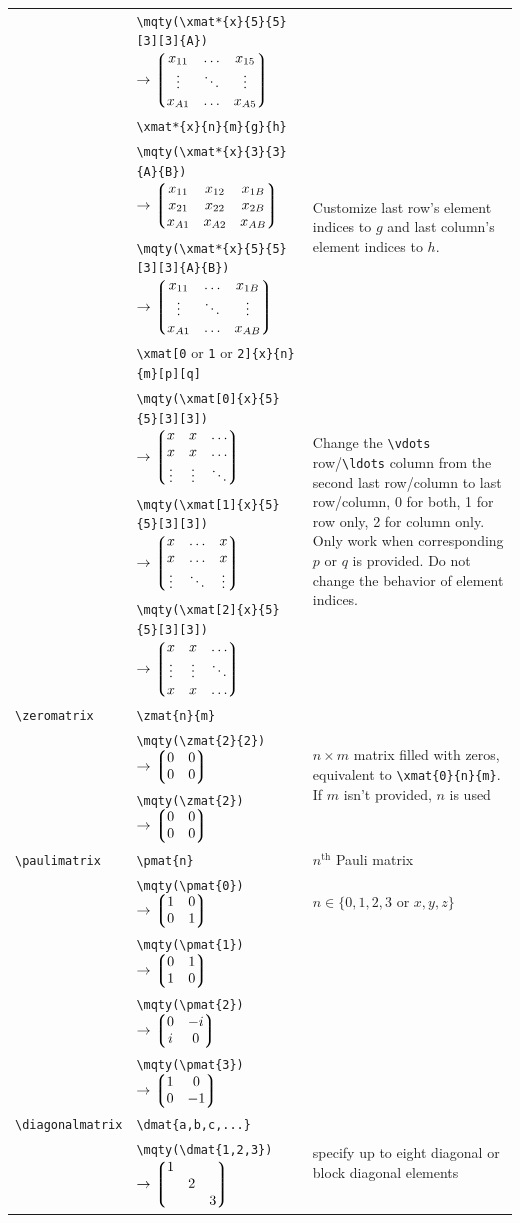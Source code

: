 \documentclass[a4paper,12pt]{article}
\begin{document}
{\begin{longtable}[c]{|p{}|p{}|p{}|}
& \verb|\mqty(\xmat*{x}{5}{5}[3][3]{A})| $\rightarrow \mqty(\xmat*{x}{5}{5}[3][3]{A})$ & \\
& \verb|\xmat*{x}{n}{m}{g}{h}| & \multirow{3}{*}{\parbox{6cm}{Customize last row's element indices to $g$ and last column's element indices to $h$.}} \\
& \verb|\mqty(\xmat*{x}{3}{3}{A}{B})| $\rightarrow \mqty(\xmat*{x}{3}{3}{A}{B})$ & \\
& \verb|\mqty(\xmat*{x}{5}{5}[3][3]{A}{B})| $\rightarrow \mqty(\xmat*{x}{5}{5}[3][3]{A}{B})$ & \\
& \verb|\xmat[0| or \verb|1| or \verb|2]{x}{n}{m}[p][q]| & \multirow{4}{*}{\parbox{6cm}{Change the \texttt{\textbackslash vdots} row/\texttt{\textbackslash ldots} column from the second last row/column to last row/column, 0 for both, 1 for row only, 2 for column only. Only work when corresponding $p$ or $q$ is provided. Do not change the behavior of element indices.}} \\
& \verb|\mqty(\xmat[0]{x}{5}{5}[3][3])| $\rightarrow \mqty(\xmat[0]{x}{5}{5}[3][3])$ & \\
& \verb|\mqty(\xmat[1]{x}{5}{5}[3][3])| $\rightarrow \mqty(\xmat[1]{x}{5}{5}[3][3])$ & \\
& \verb|\mqty(\xmat[2]{x}{5}{5}[3][3])| $\rightarrow \mqty(\xmat[2]{x}{5}{5}[3][3])$ & \\\hline
\verb|\zeromatrix| & \verb|\zmat{n}{m}| & \multirow{3}{*}{\parbox{6cm}{$n \times m$ matrix filled with zeros, equivalent to \texttt{\textbackslash xmat\{0\}\{n\}\{m\}}. If $m$ isn't provided, $n$ is used}} \\
& \verb|\mqty(\zmat{2}{2})| $\rightarrow \mqty(\zmat{2}{2})$ & \\
& \verb|\mqty(\zmat{2})| $\rightarrow \mqty(\zmat{2})$ & \\\hline
\verb|\paulimatrix| & \verb|\pmat{n}| & $n^\text{th}$ Pauli matrix \\
& \verb|\mqty(\pmat{0})| $\rightarrow \mqty(\pmat{0})$ & $n\in \lbrace 0,1,2,3$ or $x,y,z \rbrace$ \\
& \verb|\mqty(\pmat{1})| $\rightarrow \mqty(\pmat{1})$ & \\
& \verb|\mqty(\pmat{2})| $\rightarrow \mqty(\pmat{2})$ & \\
& \verb|\mqty(\pmat{3})| $\rightarrow \mqty(\pmat{3})$ & \\\hline
\verb|\diagonalmatrix| & \verb|\dmat{a,b,c,...}| & \multirow{2}{*}{\parbox{6cm}{specify up to eight diagonal or block diagonal elements}} \\
& \verb|\mqty(\dmat{1,2,3})| $\rightarrow \mqty(\dmat{1,2,3})$ & \\

\end{longtable}}
\end{document}
